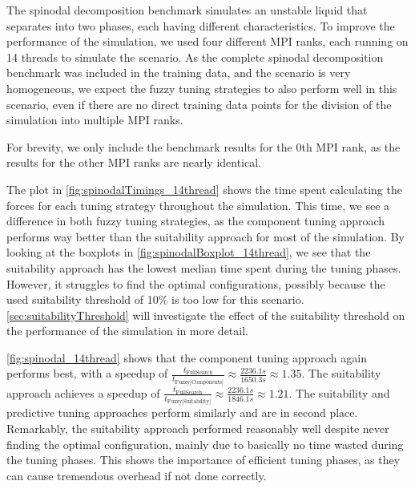 The spinodal decomposition benchmark simulates an unstable liquid that separates into two phases, each having different characteristics. To improve the performance of the simulation, we used four different MPI ranks, each running on 14 threads to simulate the scenario. As the complete spinodal decomposition benchmark was included in the training data, and the scenario is very homogeneous, we expect the fuzzy tuning strategies to also perform well in this scenario, even if there are no direct training data points for the division of the simulation into multiple MPI ranks.

For brevity, we only include the benchmark results for the 0th MPI rank, as the results for the other MPI ranks are nearly identical.

The plot in \autoref{fig:spinodalTimings_14thread} shows the time spent calculating the forces for each tuning strategy throughout the simulation. This time, we see a difference in both fuzzy tuning strategies, as the component tuning approach performs way better than the suitability approach for most of the simulation. By looking at the boxplots in \autoref{fig:spinodalBoxplot_14thread}, we see that the suitability approach has the lowest median time spent during the tuning phases. However, it struggles to find the optimal configurations, possibly because the used suitability threshold of 10\% is too low for this scenario. \autoref{sec:suitabilityThreshold} will investigate the effect of the suitability threshold on the performance of the simulation in more detail.

\autoref{fig:spinodal_14thread} shows that the component tuning approach again performs best, with a speedup of $\frac{t_{\text{FullSearch}}}{t_{\text{Fuzzy[Components]}}} \approx \frac{2236.1s}{1650.3s} \approx 1.35$. The suitability approach achieves a speedup of $\frac{t_{\text{FullSearch}}}{t_{\text{Fuzzy[Suitability]}}} \approx \frac{2236.1s}{1846.1s} \approx 1.21$. The suitability and predictive tuning approaches perform similarly and are in second place. Remarkably, the suitability approach performed reasonably well despite never finding the optimal configuration, mainly due to basically no time wasted during the tuning phases. This shows the importance of efficient tuning phases, as they can cause tremendous overhead if not done correctly.

\newpage



